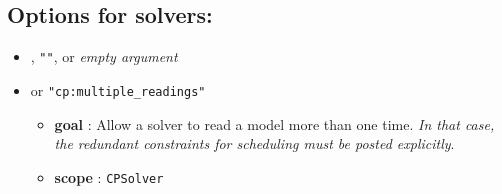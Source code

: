 \begin{itemize}
	\end{itemize}

	
\subsection{Options for solvers:}
	\begin{itemize}	
		\item {}, \texttt{""}, or \textit{empty argument}
		\item \label{smultiplereading:smultiplereadingoptions}\hypertarget{smultiplereading:smultiplereadingoptions}{}		
		 or \texttt{"cp:multiple\_readings"}
		\begin{itemize}
				\item \textbf{goal} : Allow a solver to read a model more than one time. \textit{In that case, the redundant constraints for scheduling must be posted explicitly}.
				\item \textbf{scope} : \texttt{CPSolver}
		\end{itemize}
	\end{itemize}